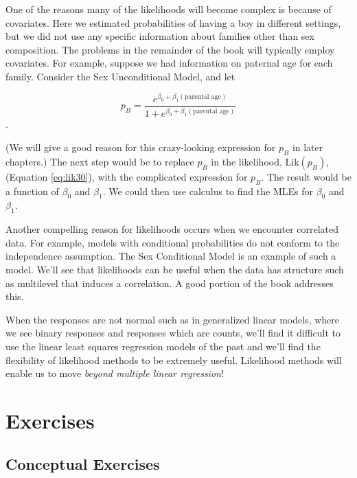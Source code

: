 \documentclass[
]{krantz}
\newcommand{\Lik}{\mathrm{Lik}}
\begin{document}
One of the reasons many of the likelihoods will become complex is because of covariates. Here we estimated probabilities of having a boy in different settings, but we did not use any specific information about families other than sex composition. The problems in the remainder of the book will typically employ covariates. For example, suppose we had information on paternal age for each family. Consider the Sex Unconditional Model, and let

\[
p_B= \frac{e^{\beta_0+\beta_1(\textrm{parental age})}}
{1+e^{\beta_0+\beta_1(\textrm{parental age})}}
\].

(We will give a good reason for this crazy-looking expression for \(p_B\) in later chapters.) The next step would be to replace \(p_B\) in the likelihood, \(\Lik(p_B)\), (Equation \eqref{eq:lik30}), with the complicated expression for \(p_B\). The result would be a function of \(\beta_0\) and \(\beta_1\). We could then use calculus to find the MLEs for \(\beta_0\) and \(\beta_1\).

Another compelling reason for likelihoods occurs when we encounter correlated data. For example, models with conditional probabilities do not conform to the independence assumption. The Sex Conditional Model is an example of such a model. We'll see that likelihoods can be useful when the data has structure such as multilevel that induces a correlation. A good portion of the book addresses this.

When the responses are not normal such as in generalized linear models, where we see binary responses and responses which are counts, we'll find it difficult to use the linear least squares regression models of the past and we'll find the flexibility of likelihood methods to be extremely useful. Likelihood methods will enable us to move \emph{beyond multiple linear regression}!

\hypertarget{exercises-1}{%
\section{Exercises}\label{exercises-1}}

\hypertarget{conceptual-exercises-1}{%
\subsection{Conceptual Exercises}\label{conceptual-exercises-1}}
\end{document}
